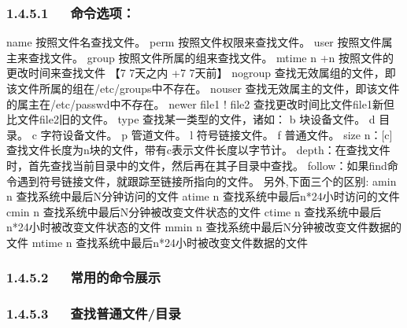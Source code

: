 \documentclass[letterpaper,12pt,english]{sphinxmanual}
\begin{document}
\subsubsection{1.4.5.1   命令选项：}
\label{\detokenize{001software/001install/linux:id7}}
\begin{sphinxVerbatim}[commandchars=\\\{\}]
\PYGZhy{}name   按照文件名查找文件。
\PYGZhy{}perm   按照文件权限来查找文件。
\PYGZhy{}user   按照文件属主来查找文件。
\PYGZhy{}group  按照文件所属的组来查找文件。
\PYGZhy{}mtime \PYGZhy{}n +n 按照文件的更改时间来查找文件 【\PYGZhy{}7 7天之内 +7 7天前】
\PYGZhy{}nogroup  查找无效属组的文件，即该文件所属的组在/etc/groups中不存在。
\PYGZhy{}nouser  查找无效属主的文件，即该文件的属主在/etc/passwd中不存在。
\PYGZhy{}newer file1 ! file2 查找更改时间比文件file1新但比文件file2旧的文件。
\PYGZhy{}type  查找某一类型的文件，诸如：
         b \PYGZhy{} 块设备文件。
         d \PYGZhy{} 目录。
         c \PYGZhy{} 字符设备文件。
         p \PYGZhy{} 管道文件。
         l \PYGZhy{} 符号链接文件。
         f \PYGZhy{} 普通文件。
\PYGZhy{}size n：[c] 查找文件长度为n块的文件，带有c表示文件长度以字节计。
\PYGZhy{}depth：在查找文件时，首先查找当前目录中的文件，然后再在其子目录中查找。
\PYGZhy{}follow：如果find命令遇到符号链接文件，就跟踪至链接所指向的文件。
另外,下面三个的区别:
\PYGZhy{}amin n    查找系统中最后N分钟访问的文件
\PYGZhy{}atime n   查找系统中最后n*24小时访问的文件
\PYGZhy{}cmin n    查找系统中最后N分钟被改变文件状态的文件
\PYGZhy{}ctime n   查找系统中最后n*24小时被改变文件状态的文件
\PYGZhy{}mmin n    查找系统中最后N分钟被改变文件数据的文件
\PYGZhy{}mtime n   查找系统中最后n*24小时被改变文件数据的文件
\end{sphinxVerbatim}


\subsubsection{1.4.5.2   常用的命令展示}
\label{\detokenize{001software/001install/linux:id8}}

\subsubsection{1.4.5.3   查找普通文件/目录}
\label{\detokenize{001software/001install/linux:id9}}
\begin{sphinxVerbatim}[commandchars=\\\{\}]
     
     
\end{sphinxVerbatim}
\end{document}

